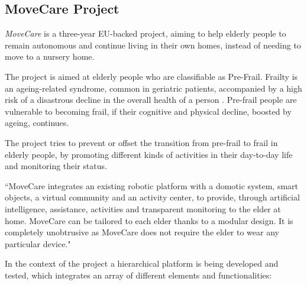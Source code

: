 \documentclass[12pt,a4paper,oneside]{report}
\begin{document}
\subsection{MoveCare Project}
\textit{MoveCare} \cite{movecare} is a three-year EU-backed project, aiming to help elderly people to remain autonomous and continue living in their own homes, instead of needing to move to a nursery home.

The project is aimed at elderly people who are classifiable as Pre-Frail. Frailty is an ageing-related syndrome, common in geriatric patients, accompanied by a high risk of a disastrous decline in the overall health of a person \cite{frailty}. Pre-frail people are vulnerable to becoming frail, if their cognitive and physical decline, boosted by ageing, continues.

The project tries to prevent or offset the transition from pre-frail to frail in elderly people, by promoting different kinds of activities in their day-to-day life and monitoring their status.

``MoveCare integrates an existing robotic platform with a domotic system, smart objects, a virtual community and an activity center, to provide, through artificial intelligence, assistance, activities and transparent monitoring to the elder at home. MoveCare can be tailored to each elder thanks to a modular design. It is completely unobtrusive as MoveCare does not require the elder to wear any particular device."

In the context of the project a hierarchical platform is being developed and tested, which integrates an array of different elements and functionalities:
\end{document}
